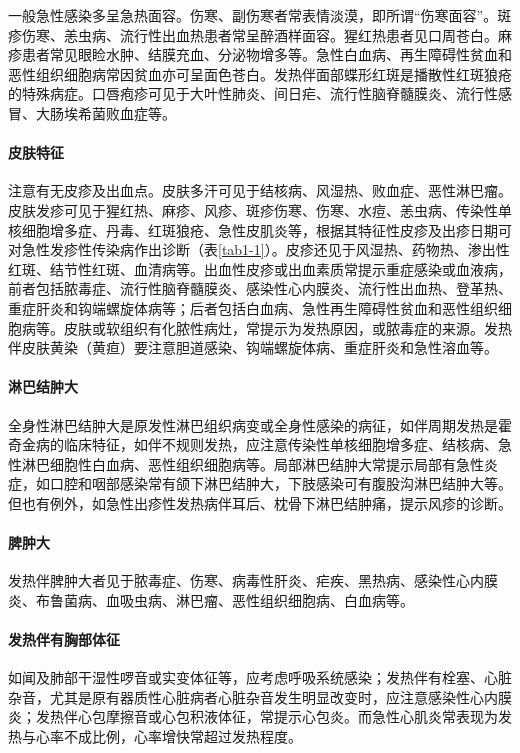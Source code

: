 一般急性感染多呈急热面容。伤寒、副伤寒者常表情淡漠，即所谓“伤寒面容”。斑疹伤寒、恙虫病、流行性出血热患者常呈醉酒样面容。猩红热患者见口周苍白。麻疹患者常见眼睑水肿、结膜充血、分泌物增多等。急性白血病、再生障碍性贫血和恶性组织细胞病常因贫血亦可呈面色苍白。发热伴面部蝶形红斑是播散性红斑狼疮的特殊病症。口唇疱疹可见于大叶性肺炎、间日疟、流行性脑脊髓膜炎、流行性感冒、大肠埃希菌败血症等。

\paragraph{皮肤特征}

注意有无皮疹及出血点。皮肤多汗可见于结核病、风湿热、败血症、恶性淋巴瘤。皮肤发疹可见于猩红热、麻疹、风疹、斑疹伤寒、伤寒、水痘、恙虫病、传染性单核细胞增多症、丹毒、红斑狼疮、急性皮肌炎等，根据其特征性皮疹及出疹日期可对急性发疹性传染病作出诊断（表\ref{tab1-1}）。皮疹还见于风湿热、药物热、渗出性红斑、结节性红斑、血清病等。出血性皮疹或出血素质常提示重症感染或血液病，前者包括脓毒症、流行性脑脊髓膜炎、感染性心内膜炎、流行性出血热、登革热、重症肝炎和钩端螺旋体病等；后者包括白血病、急性再生障碍性贫血和恶性组织细胞病等。皮肤或软组织有化脓性病灶，常提示为发热原因，或脓毒症的来源。发热伴皮肤黄染（黄疸）要注意胆道感染、钩端螺旋体病、重症肝炎和急性溶血等。

\paragraph{淋巴结肿大}

全身性淋巴结肿大是原发性淋巴组织病变或全身性感染的病征，如伴周期发热是霍奇金病的临床特征，如伴不规则发热，应注意传染性单核细胞增多症、结核病、急性淋巴细胞性白血病、恶性组织细胞病等。局部淋巴结肿大常提示局部有急性炎症，如口腔和咽部感染常有颌下淋巴结肿大，下肢感染可有腹股沟淋巴结肿大等。但也有例外，如急性出疹性发热病伴耳后、枕骨下淋巴结肿痛，提示风疹的诊断。

\paragraph{脾肿大}

发热伴脾肿大者见于脓毒症、伤寒、病毒性肝炎、疟疾、黑热病、感染性心内膜炎、布鲁菌病、血吸虫病、淋巴瘤、恶性组织细胞病、白血病等。

\paragraph{发热伴有胸部体征}

如闻及肺部干湿性啰音或实变体征等，应考虑呼吸系统感染；发热伴有栓塞、心脏杂音，尤其是原有器质性心脏病者心脏杂音发生明显改变时，应注意感染性心内膜炎；发热伴心包摩擦音或心包积液体征，常提示心包炎。而急性心肌炎常表现为发热与心率不成比例，心率增快常超过发热程度。

